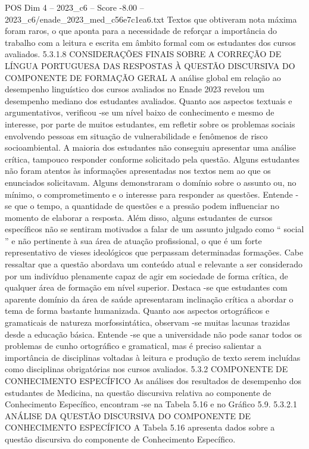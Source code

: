 \begin{textsample}{POS Dim 4 – 2023\_c6 – Score -8.00 – 2023\_c6/enade\_2023\_med\_c56e7c1ea6.txt}
Textos que obtiveram nota máxima foram raros, o que aponta para a necessidade de reforçar a importância do trabalho com a leitura e escrita em âmbito formal com os estudantes dos cursos avaliados. 5.3.1.8 CONSIDERAÇÕES FINAIS SOBRE A CORREÇÃO DE LÍNGUA PORTUGUESA DAS RESPOSTAS À QUESTÃO DISCURSIVA DO COMPONENTE DE FORMAÇÃO GERAL A análise global em relação ao desempenho linguístico dos cursos avaliados no Enade 2023 revelou um desempenho mediano dos estudantes avaliados.
Quanto aos aspectos textuais e argumentativos, verificou -se um nível baixo de conhecimento e mesmo de interesse, por parte de muitos estudantes, em refletir sobre os problemas sociais envolvendo pessoas em situação de vulnerabilidade e fenômenos de risco socioambiental.
A maioria dos estudantes não conseguiu apresentar uma análise crítica, tampouco responder conforme solicitado pela questão.
Alguns estudantes não foram atentos às informações apresentadas nos textos nem ao que os enunciados solicitavam.
Alguns demonstraram o domínio sobre o assunto ou, no mínimo, o comprometimento e o interesse para responder as questões.
Entende -se que o tempo, a quantidade de questões e a pressão podem influenciar no momento de elaborar a resposta.
Além disso, alguns estudantes de cursos específicos não se sentiram motivados a falar de um assunto julgado como “ social ” e não pertinente à sua área de atuação profissional, o que é um forte representativo de vieses ideológicos que perpassam determinadas formações.
Cabe ressaltar que a questão abordava um conteúdo atual e relevante a ser considerado por um indivíduo plenamente capaz de agir em sociedade de forma crítica, de qualquer área de formação em nível superior.
Destaca -se que estudantes com aparente domínio da área de saúde apresentaram inclinação crítica a abordar o tema de forma bastante humanizada.
Quanto aos aspectos ortográficos e gramaticais de natureza morfossintática, observam -se muitas lacunas trazidas desde a educação básica.
Entende -se que a universidade não pode sanar todos os problemas de cunho ortográfico e gramatical, mas é preciso salientar a importância de disciplinas voltadas à leitura e produção de texto serem incluídas como disciplinas obrigatórias nos cursos avaliados. 5.3.2 COMPONENTE DE CONHECIMENTO ESPECÍFICO As análises dos resultados de desempenho dos estudantes de Medicina, na questão discursiva relativa ao componente de Conhecimento Específico, encontram -se na Tabela 5.16 e no Gráfico 5.9. 5.3.2.1 ANÁLISE DA QUESTÃO DISCURSIVA DO COMPONENTE DE CONHECIMENTO ESPECÍFICO A Tabela 5.16 apresenta dados sobre a questão discursiva do componente de Conhecimento Específico.

\end{textsample}
